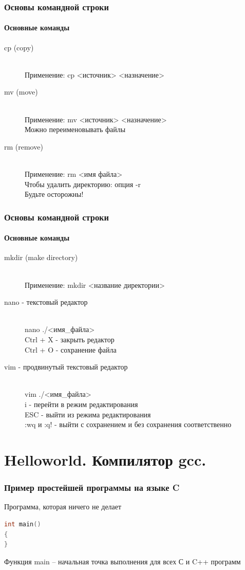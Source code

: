 \documentclass[12pt,pdf,hyperref={unicode}]{beamer}
\begin{document}
\begin{frame}
\frametitle{Основы командной строки} 
\framesubtitle{Основные команды}
\begin{description}
  \item[cp (copy)] \hfill \\
  Применение: cp <источник> <назначение>
  \item[mv (move)] \hfill \\
  Применение: mv <источник> <назначение>\\
  Можно переименовывать файлы
  \item[rm (remove)] \hfill \\
  Применение: rm <имя файла> \\
  Чтобы удалить директорию: опция -r\\
  Будьте осторожны!
\end{description}
\end{frame}

\begin{frame}
\frametitle{Основы командной строки} 
\framesubtitle{Основные команды}
\begin{description}
  \item[mkdir (make directory)] \hfill \\
  Применение: mkdir <название директории>
  \item[nano - текстовый редактор] \hfill \\
  nano ./<имя\_файла>\\
  Ctrl + X - закрыть редактор\\
  Ctrl + O - сохранение файла
  \item[vim - продвинутый текстовый редактор] \hfill \\
  vim ./<имя\_файла>\\
  i - перейти в режим редактирования\\
  ESC - выйти из режима редактирования\\
  :wq и :q! - выйти с сохранением и без сохранения соответственно
\end{description}
\end{frame}


\section{Helloworld. Компилятор gcc.}


\begin{frame}[fragile]
\frametitle{Пример простейшей программы на языке C}
Программа, которая ничего не делает \\
\begin{lstlisting}[language=C++,basicstyle=\ttfamily,keywordstyle=\color{blue}]
int main()
{
}
\end{lstlisting}
Функция main -- начальная точка выполнения для всех С и C++ программ
\end{frame}
\end{document}
